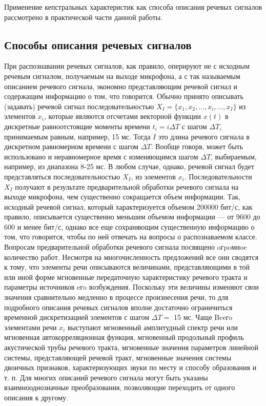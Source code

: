 \documentclass[a4paper,14pt,russian,utf8,nocolumnsxix,nocolumnxxxi,nocolumnxxxii]{eskdtext}
\begin{document}
Применение кепстральных характеристик как способа описания речевых сигналов рассмотрено в практической части данной работы.

\subsection{Способы описания речевых сигналов}

При распознавании речевых сигналов, как правило, оперируют не с исходным речевым сигналом, получаемым на выходе микрофона, а с так называемым описанием речевого сигнала, экономно представляющим речевой сигнал и содержащим информацию о том, что говорится. 
Обычно принято описывать (задавать) речевой сигнал последовательностью $X_{I}=\{x_{1},x_{2},\dots,x_{i},\dots,x_{I}\}$ из элементов $x_{i}$, которые являются отсчетами векторной функции $x(t)$ в дискретные равноотстоящие моменты времени $t_{i}=i\Delta T$ с шагом $\Delta T$, принимаемым равным, например, 15 мс. Тогда $I$ это длина речевого сигнала в дискретном равномерном времени с шагом $\Delta T$. Вообще говоря, может быть использовано и неравномерное время с изменяющимся шагом $\Delta T$, выбираемым, например, из диапазона 8-25 мс. В любом случае, однако, речевой сигнал будет представляться последовательностью $X_{I}$, из элементов $x_{i}$. 
Последовательности $X_{I}$ получают в результате предварительной обработки речевого сигнала на выходе микрофона, чем существенно сокращается объем информации. Так, исходный речевой сигнал, который характеризуется объемом 200000 бит/с, как правило, описывается существенно меньшим объемом информации --- от 9600 до 600 и менее бит/с, однако все еще сохраняющим существенную информацию о том, что говорится, чтобы по ней отвечать на вопросы о распознаваемом классе. 
Вопросам предварительной обработки речевого сигнала посвящено oгpoмнoe количество работ.\cite{agran,rabiner1,rabiner_eng,vincuk} Несмотря на многочисленность предложений все они сводятся к тому, что элементы речи описываются величинами, представляющими в той или иной форме мгновенные передаточную характеристику речевого тракта и параметры источников eгo возбуждения. Поскольку эти величины изменяют свои значения сравнительно медленно в процессе произнесения речи, то для подробного описания речевых сигналов вполне достаточно ограничиться временной дискретизацией элементов с шагом $\Delta T=$ 15 мс. 
Чаще Bceгo элементами речи $x_{i}$ выступают мгновенный амплитудный спектр речи или мгновенная автокорреляционная функция, мгновенный продольный профиль акустической трубы речевого тракта, мгновенные значения параметров линейной системы, представляющей речевой тракт, мгновенные значения системы двоичных признаков, характеризующих звуки по месту и способу образования и т. п. Для многих описаний речевого сигнала могут быть указаны взаимнооднозначные преобразования, позволяющие переходить от одного описания к другому. 
\end{document}
